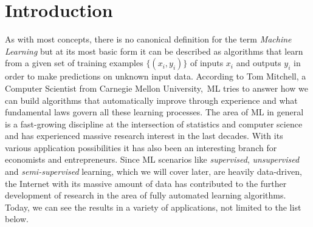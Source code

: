 \documentclass[conference,compsoc]{IEEEtran}
\begin{document}
\section{Introduction}
As with most concepts, there is no canonical 
definition for the term \textit{Machine Learning} but at its most basic form it 
can be described as algorithms that learn from a given set of training examples 
$\{(x_i, y_i)\}$ of inputs $x_i$ and outputs $y_i$ in order to 
make predictions on unknown input data. According to Tom 
Mitchell, a Computer Scientist from Carnegie Mellon University, ML tries 
to answer how we can build algorithms that automatically improve through 
experience and what fundamental laws govern all these learning processes\cite{ML:mitchell}.
The area of ML in general is a fast-growing discipline at the intersection of statistics 
and computer science and has experienced massive research interest in the last decades.
With its various application possibilities it has also been an interesting branch for 
economists and entrepreneurs.
Since ML scenarios like \textit{supervised}, \textit{unsupervised} and 
\textit{semi-supervised} learning, which we will cover later, are heavily data-driven, 
the Internet with its massive amount of data has contributed to the further development 
of research in the area of fully automated learning algorithms. Today, we can see the 
results in a variety of applications\cite{FoundationsOfML:mohri}\cite{DisciplineOfML:mitchell}, 
not limited to the list below.
\end{document}

